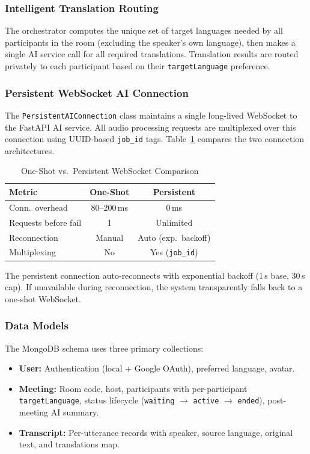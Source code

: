 \documentclass[conference]{IEEEtran}
\begin{document}
\subsubsection{Intelligent Translation Routing}

The orchestrator computes the unique set of target languages needed by all participants in the room (excluding the speaker's own language), then makes a single AI service call for all required translations. Translation results are routed privately to each participant based on their \texttt{targetLanguage} preference.

\subsubsection{Persistent WebSocket AI Connection}

The \texttt{PersistentAIConnection} class maintains a single long-lived WebSocket to the FastAPI AI service. All audio processing requests are multiplexed over this connection using UUID-based \texttt{job\_id} tags. Table~\ref{tab:wscomp} compares the two connection architectures.

\begin{table}[htbp]
\centering
\caption{One-Shot vs.\ Persistent WebSocket Comparison}
\label{tab:wscomp}
\begin{tabular}{lcc}
\toprule
\textbf{Metric} & \textbf{One-Shot} & \textbf{Persistent} \\
\midrule
Conn.\ overhead & 80--200\,ms & 0\,ms \\
Requests before fail & 1 & Unlimited \\
Reconnection & Manual & Auto (exp.\ backoff) \\
Multiplexing & No & Yes (\texttt{job\_id}) \\
\bottomrule
\end{tabular}
\end{table}

The persistent connection auto-reconnects with exponential backoff (1\,s base, 30\,s cap). If unavailable during reconnection, the system transparently falls back to a one-shot WebSocket.

\subsubsection{Data Models}

The MongoDB schema uses three primary collections:
\begin{itemize}
  \item \textbf{User:} Authentication (local + Google OAuth), preferred language, avatar.
  \item \textbf{Meeting:} Room code, host, participants with per-participant \texttt{targetLanguage}, status lifecycle (\texttt{waiting} $\rightarrow$ \texttt{active} $\rightarrow$ \texttt{ended}), post-meeting AI summary.
  \item \textbf{Transcript:} Per-utterance records with speaker, source language, original text, and translations map.
\end{itemize}
\end{document}
